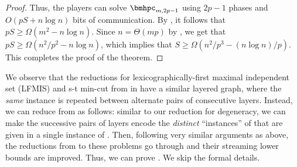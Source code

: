 \begin{proof}
Thus, the players can solve $\bmhpc_{m,2p-1}$ using $2p-1$ phases and $O(pS+n\log n)$ bits of communication. By , it follows that $pS\geq \Omega(m^2- n\log n)$. Since $n=\Theta(mp)$ by , we get that $pS\geq \Omega(n^2/p^2 - n\log n)$, which implies that $S\geq \Omega(n^2/p^3 - (n\log n)/p)$. This completes the proof of the theorem.  \end{proof}

We observe that the reductions for lexicographically-first maximal independent set (LFMIS) and s-t min-cut from \hpc in \cite{AssadiCK19} have a similar layered graph, where the \emph{same} \hpc instance is repeated between alternate pairs of consecutive layers. Instead, we can reduce from \mhpc as follows: similar to our reduction for degeneracy, we can make the successive pairs of layers encode the \emph{distinct} ``instances'' of \hpc that are given in a single instance of \mhpc. Then, following very similar arguments as above, the reductions from \mhpc to these problems go through and their streaming lower bounds are improved. Thus, we can prove . We skip the formal details. 

